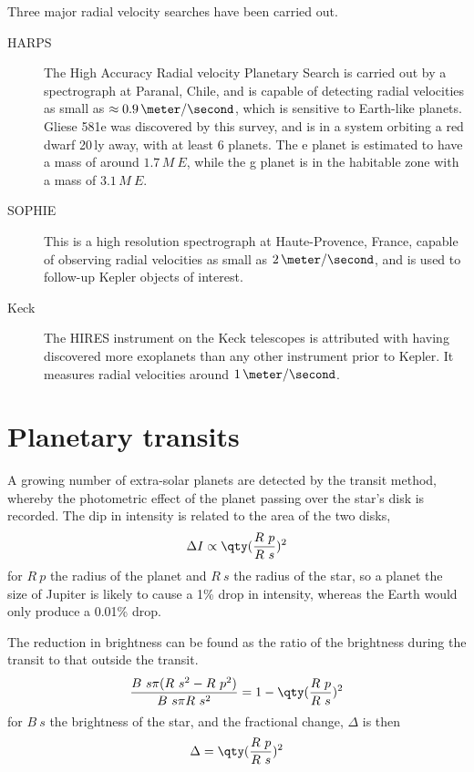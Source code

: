 Three major radial velocity searches have been carried out.
\begin{description}
\item[HARPS] The High Accuracy Radial velocity Planetary Search is
  carried out by a spectrograph at Paranal, Chile, and is capable of
  detecting radial velocities as small as $\approx
  0.9\,\meter/\second$, which is sensitive to Earth-like
  planets. Gliese 581e was discovered by this survey, and is in a
  system orbiting a red dwarf 20\,ly away, with at least 6
  planets. The e planet is estimated to have a mass of around
  $1.7\,M~E$, while the g planet is in the habitable zone with a mass
  of $3.1\,M~E$.
\item[SOPHIE] This is a high resolution spectrograph at
  Haute-Provence, France, capable of observing radial velocities as
  small as $2\,\meter/\second$, and is used to follow-up Kepler
  objects of interest.
\item[Keck] The HIRES instrument on the Keck telescopes is attributed
  with having discovered more exoplanets than any other instrument
  prior to Kepler. It measures radial velocities around
  $1\,\meter/\second$.
\end{description}

\section{Planetary transits}
\label{sec:planetary-transits}

A growing number of extra-solar planets are detected by the transit
method, whereby the photometric effect of the planet passing over the
star's disk is recorded. The dip in intensity is related to the area
of the two disks,
\begin{equation}
  \label{eq:19}
  \Delta I \propto \qty( \frac{R~p}{R~s} )^2
\end{equation}
for $R~p$ the radius of the planet and $R~s$ the radius of the star,
so a planet the size of Jupiter is likely to cause a 1\% drop in
intensity, whereas the Earth would only produce a 0.01\% drop.

The reduction in brightness can be found as the ratio of the
brightness during the transit to that outside the transit.
\begin{equation}
  \label{eq:20}
  \frac{B~s \pi (R~s^2 - R~p^2)}{B~s \pi R~s^2} = 1 - \qty( \frac{R~p}{R~s} )^2
\end{equation}
for $B~s$ the brightness of the star, and the fractional change,
$\Delta$ is then
\begin{equation}
  \label{eq:21}
  \Delta = \qty( \frac{R~p}{R~s} )^2
\end{equation}

